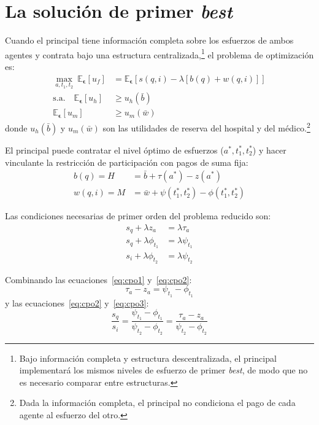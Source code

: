 \documentclass[12pt, a4paper, twoside, openright]{book}
\newcommand{\E}{\mathbb{E}}
\theoremstyle{plain}
\theoremstyle{definition}
\theoremstyle{remark}
\begin{document}
\section{La solución de primer \texorpdfstring{\textit{best}}{best}}
\label{sec:primer_best}

Cuando el principal tiene información completa sobre los esfuerzos de ambos agentes y contrata bajo una estructura centralizada,\footnote{Bajo información completa y estructura descentralizada, el principal implementará los mismos niveles de esfuerzo de primer \textit{best}, de modo que no es necesario comparar entre estructuras.} el problema de optimización es:
\begin{align*}
    \max_{a,t_1,t_2}\ \E_{\bm{\epsilon}}[u_f] &= \E_{\bm{\epsilon}}\left[s(q,i)-\lambda[b(q)+w(q,i)]\right]\\
    \text{s.a.}\quad \E_{\bm{\epsilon}}[u_h] &\geq u_h(\bar{b})\\
    \E_{\bm{\epsilon}}[u_m] &\geq u_m(\bar{w})
\end{align*}
donde $u_h(\bar{b})$ y $u_m(\bar{w})$ son las utilidades de reserva del hospital y del médico.\footnote{Dada la información completa, el principal no condiciona el pago de cada agente al esfuerzo del otro.}

El principal puede contratar el nivel óptimo de esfuerzos ($a^*,t^*_1,t^*_2$) y hacer vinculante la restricción de participación con pagos de suma fija:
\begin{align}
  b(q) = H &= \bar{b}+\tau(a^*)-z(a^*) \label{eq:pago_h_fb}\\
  w(q,i) = M &= \bar{w}+\psi(t_1^*,t_2^*)-\phi(t_1^*,t_2^*) \label{eq:pago_m_fb}
\end{align}

Las condiciones necesarias de primer orden del problema reducido son:
\begin{align}
  s_q+\lambda z_a &= \lambda\tau_a \label{eq:cpo1}\\
  s_q+\lambda\phi_{t_1} &= \lambda\psi_{t_1} \label{eq:cpo2}\\
  s_i+\lambda\phi_{t_2} &= \lambda\psi_{t_2} \label{eq:cpo3}
\end{align}

Combinando las ecuaciones~\eqref{eq:cpo1} y~\eqref{eq:cpo2}:
\begin{equation}
    \tau_a-z_a=\psi_{t_1}-\phi_{t_1}
    \label{eq:cpo_q}
\end{equation}
y las ecuaciones~\eqref{eq:cpo2} y~\eqref{eq:cpo3}:
\begin{equation}
  \frac{s_q}{s_i}=\frac{\psi_{t_1}-\phi_{t_1}}{\psi_{t_2}-\phi_{t_2}}=\frac{\tau_a-z_a}{\psi_{t_2}-\phi_{t_2}}
  \label{eq:cpo_qi}
\end{equation}
\end{document}
